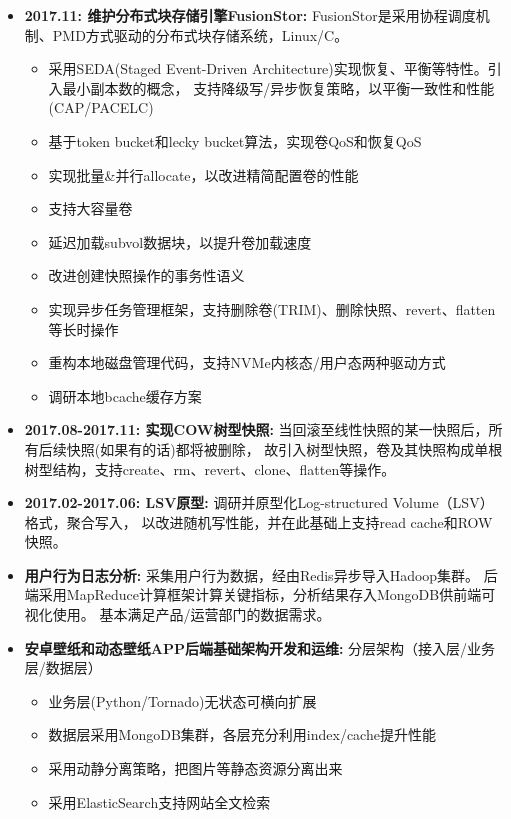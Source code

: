   \begin{itemize}[leftmargin=*]
      \item \textbf{2017.11: 维护分布式块存储引擎FusionStor:} FusionStor是采用协程调度机制、PMD方式驱动的分布式块存储系统，Linux/C。
          {\small
          \begin{itemize}
              \item 采用SEDA(Staged Event-Driven Architecture)实现恢复、平衡等特性。引入最小副本数的概念，
                  支持降级写/异步恢复策略，以平衡一致性和性能(CAP/PACELC)
              \item 基于token bucket和lecky bucket算法，实现卷QoS和恢复QoS
              \item 实现批量\&并行allocate，以改进精简配置卷的性能
              \item 支持大容量卷
              \item 延迟加载subvol数据块，以提升卷加载速度
              \item 改进创建快照操作的事务性语义
              \item 实现异步任务管理框架，支持删除卷(TRIM)、删除快照、revert、flatten等长时操作
              \item 重构本地磁盘管理代码，支持NVMe内核态/用户态两种驱动方式
              \item 调研本地bcache缓存方案
          \end{itemize}
          }

      \item \textbf{2017.08-2017.11: 实现COW树型快照:} 当回滚至线性快照的某一快照后，所有后续快照(如果有的话)都将被删除，
          故引入树型快照，卷及其快照构成单根树型结构，支持create、rm、revert、clone、flatten等操作。

      \item \textbf{2017.02-2017.06: LSV原型:} 调研并原型化Log-structured Volume（LSV）格式，聚合写入，
          以改进随机写性能，并在此基础上支持read cache和ROW快照。

      \item \textbf{用户行为日志分析:} 采集用户行为数据，经由Redis异步导入Hadoop集群。
          后端采用MapReduce计算框架计算关键指标，分析结果存入MongoDB供前端可视化使用。
          基本满足产品/运营部门的数据需求。

      \item \textbf{安卓壁纸和动态壁纸APP后端基础架构开发和运维:} 分层架构（接入层/业务层/数据层）
          {\small
          \begin{itemize}
              \item 业务层(Python/Tornado)无状态可横向扩展
              \item 数据层采用MongoDB集群，各层充分利用index/cache提升性能
              \item 采用动静分离策略，把图片等静态资源分离出来
              \item 采用ElasticSearch支持网站全文检索
          \end{itemize}
          }


\end{itemize}
